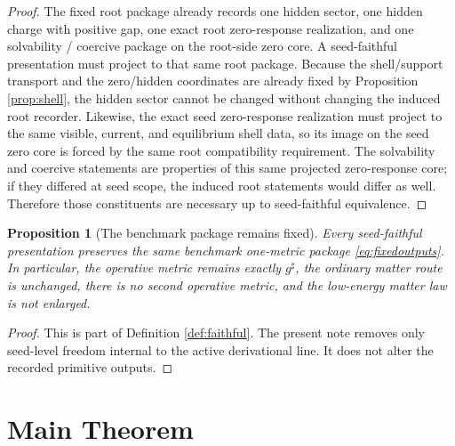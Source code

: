 \documentclass[11pt]{article}
\newcommand{\CompletedMetric}{g^{\sharp}}
\newtheorem{proposition}{Proposition}
\begin{document}
\begin{proof}
The fixed root package already records one hidden sector, one hidden charge with positive gap, one exact root zero-response realization, and one solvability / coercive package on the root-side zero core. A seed-faithful presentation must project to that same root package. Because the shell/support transport and the zero/hidden coordinates are already fixed by Proposition \ref{prop:shell}, the hidden sector cannot be changed without changing the induced root recorder. Likewise, the exact seed zero-response realization must project to the same visible, current, and equilibrium shell data, so its image on the seed zero core is forced by the same root compatibility requirement. The solvability and coercive statements are properties of this same projected zero-response core; if they differed at seed scope, the induced root statements would differ as well. Therefore those constituents are necessary up to seed-faithful equivalence.
\end{proof}

\begin{proposition}[The benchmark package remains fixed]
\label{prop:benchmark}
Every seed-faithful presentation preserves the same benchmark one-metric package \eqref{eq:fixedoutputs}. In particular, the operative metric remains exactly \(\CompletedMetric\), the ordinary matter route is unchanged, there is no second operative metric, and the low-energy matter law is not enlarged.
\end{proposition}

\begin{proof}
This is part of Definition \ref{def:faithful}. The present note removes only seed-level freedom internal to the active derivational line. It does not alter the recorded primitive outputs.
\end{proof}

\section{Main Theorem}
\end{document}
